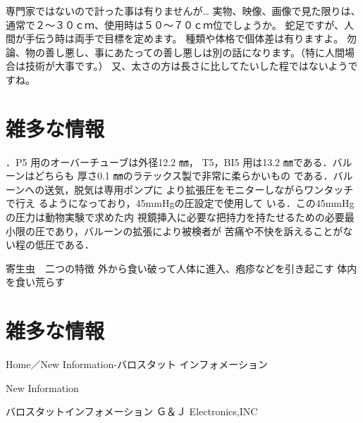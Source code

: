 専門家ではないので計った事は有りませんが…
実物、映像、画像で見た限りは、通常で２～３０ｃｍ、使用時は５０～７０ｃｍ位でしょうか。
蛇足ですが、人間が手伝う時は両手で目標を定めます。
種類や体格で個体差は有りますよ。
勿論、物の善し悪し、事にあたっての善し悪しは別の話になります。（特に人間場合は技術が大事です。）
又、太さの方は長さに比してたいした程ではないようですね。

\section{雑多な情報}
．P5 用のオーバーチューブは外径12.2 ㎜，
T5，BI5 用は13.2 ㎜である．バルーンはどちらも
厚さ0.1 ㎜のラテックス製で非常に柔らかいもの
である．バルーンへの送気，脱気は専用ポンプに
より拡張圧をモニターしながらワンタッチで行え
るようになっており，45mmHgの圧設定で使用して
いる．この45mmHg の圧力は動物実験で求めた内
視鏡挿入に必要な把持力を持たせるための必要最
小限の圧であり，バルーンの拡張により被検者が
苦痛や不快を訴えることがない程の低圧である．


寄生虫　二つの特徴
外から食い破って人体に進入、疱疹などを引き起こす
体内を食い荒らす

\section{雑多な情報}


Home／New Information-バロスタット インフォメーション

New Information

	バロスタットインフォメーション
Ｇ＆Ｊ Electronics,INC 	


